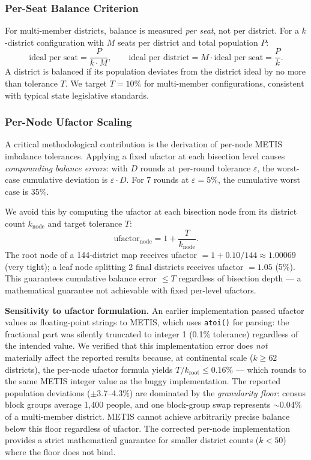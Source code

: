 \subsubsection{Per-Seat Balance Criterion}

For multi-member districts, balance is measured \emph{per seat}, not per district. For a $k$-district configuration with $M$ seats per district and total population $P$:
\begin{equation}
    \text{ideal per seat} = \frac{P}{k \cdot M}, \qquad
    \text{ideal per district} = M \cdot \text{ideal per seat} = \frac{P}{k}.
\end{equation}
A district is balanced if its population deviates from the district ideal by no more than tolerance $T$. We target $T = 10\%$ for multi-member configurations, consistent with typical state legislative standards.

\subsubsection{Per-Node Ufactor Scaling}

A critical methodological contribution is the derivation of per-node METIS imbalance tolerances. Applying a fixed ufactor at each bisection level causes \emph{compounding balance errors}: with $D$ rounds at per-round tolerance $\varepsilon$, the worst-case cumulative deviation is $\varepsilon \cdot D$. For 7 rounds at $\varepsilon = 5\%$, the cumulative worst case is 35\%.

We avoid this by computing the ufactor at each bisection node from its district count $k_{\text{node}}$ and target tolerance $T$:
\begin{equation}
    \text{ufactor}_{\text{node}} = 1 + \frac{T}{k_{\text{node}}}.
\end{equation}
The root node of a 144-district map receives ufactor $= 1 + 0.10/144 \approx 1.00069$ (very tight); a leaf node splitting 2 final districts receives ufactor $= 1.05$ (5\%). This guarantees cumulative balance error $\leq T$ regardless of bisection depth --- a mathematical guarantee not achievable with fixed per-level ufactors.

\textbf{Sensitivity to ufactor formulation.}
An earlier implementation passed ufactor values as floating-point strings to METIS, which uses \texttt{atoi()} for parsing: the fractional part was silently truncated to integer 1 (0.1\% tolerance) regardless of the intended value. We verified that this implementation error does \emph{not} materially affect the reported results because, at continental scale ($k \geq 62$ districts), the per-node ufactor formula yields $T/k_{\text{root}} \leq 0.16\%$ --- which rounds to the same METIS integer value as the buggy implementation. The reported population deviations ($\pm$3.7--4.3\%) are dominated by the \emph{granularity floor}: census block groups average 1,400 people, and one block-group swap represents $\sim$0.04\% of a multi-member district. METIS cannot achieve arbitrarily precise balance below this floor regardless of ufactor. The corrected per-node implementation provides a strict mathematical guarantee for smaller district counts ($k < 50$) where the floor does not bind.

